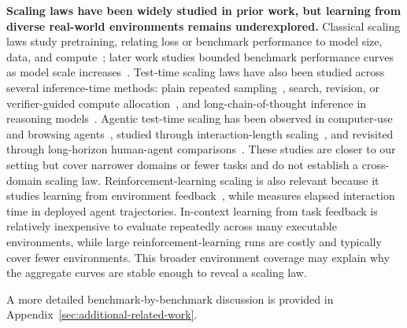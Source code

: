 \textbf{Scaling laws have been widely studied in prior work, but learning from diverse real-world environments remains underexplored.} Classical scaling laws study pretraining, relating loss or benchmark performance to model size, data, and compute~\cite{kaplan2020scaling,hoffmann2022training}; later work studies bounded benchmark performance curves as model scale increases~\cite{owen2024predictable,ruan2024observational,bhagia2024taskscaling,zhang2026prescriptive}. Test-time scaling laws have also been studied across several inference-time methods: plain repeated sampling~\cite{chen2021humaneval,li2022alphacode,brown2024largelanguagemonkeys}, search, revision, or verifier-guided compute allocation~\cite{snell2024testtime,wu2024inference}, and long-chain-of-thought inference in reasoning models~\cite{openai2024learningreason,deepseekai2025deepseekr1}. Agentic test-time scaling has been observed in computer-use and browsing agents~\cite{openai2025cua,openai2025browsecomp}, studied through interaction-length scaling~\cite{shen2025thinkingdoing}, and revisited through long-horizon human-agent comparisons~\cite{mang2026humansstillbeatai}. These studies are closer to our setting but cover narrower domains or fewer tasks and do not establish a cross-domain scaling law. Reinforcement-learning scaling is also relevant because it studies learning from environment feedback~\cite{hilton2023rlscaling,khatri2025scalingrlcompute}, while \benchmark{} measures elapsed interaction time in deployed agent trajectories. In-context learning from task feedback is relatively inexpensive to evaluate repeatedly across many executable environments, while large reinforcement-learning runs are costly and typically cover fewer environments. This broader environment coverage may explain why the aggregate curves are stable enough to reveal a scaling law.

A more detailed benchmark-by-benchmark discussion is provided in Appendix~\ref{sec:additional-related-work}.
